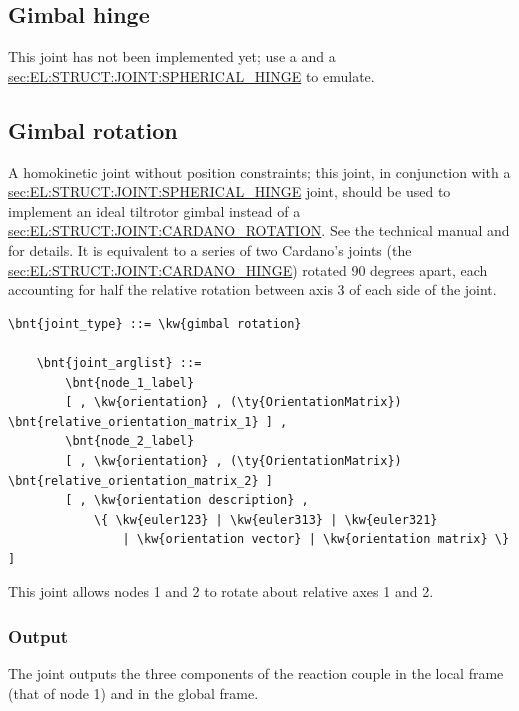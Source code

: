 \subsection{Gimbal hinge}
This joint has not been implemented yet; use a 
and a
\hyperref{\kw{spherical hinge}}{\kw{spherical hinge} (see Section~}{)}{sec:EL:STRUCT:JOINT:SPHERICAL_HINGE}
to emulate.

\subsection{Gimbal rotation}\label{sec:EL:JOINT:GIMBALROTATION}
A homokinetic joint without position constraints;
this joint, in conjunction with a
\hyperref{\kw{spherical hinge}}{\kw{spherical hinge} (see Section~}{)}{sec:EL:STRUCT:JOINT:SPHERICAL_HINGE}
joint, should be used to implement an ideal tiltrotor gimbal
instead of a
\hyperref{\kw{cardano rotation}}{\kw{cardano rotation} (see Section~}{)}{sec:EL:STRUCT:JOINT:CARDANO_ROTATION}.
See the technical manual and \cite{GIMBAL-2008} for details.
It is equivalent to a series of two Cardano's joints
(the \hyperref{\kw{cardano hinge}}{\kw{cardano hinge}, see Section~}{}{sec:EL:STRUCT:JOINT:CARDANO_HINGE})
rotated 90 degrees apart, each accounting for half the relative rotation
between axis 3 of each side of the joint.
\begin{Verbatim}[commandchars=\\\{\}]
    \bnt{joint_type} ::= \kw{gimbal rotation}

    \bnt{joint_arglist} ::= 
        \bnt{node_1_label}
        [ , \kw{orientation} , (\ty{OrientationMatrix}) \bnt{relative_orientation_matrix_1} ] ,
        \bnt{node_2_label}
        [ , \kw{orientation} , (\ty{OrientationMatrix}) \bnt{relative_orientation_matrix_2} ]
        [ , \kw{orientation description} ,
            \{ \kw{euler123} | \kw{euler313} | \kw{euler321}
                | \kw{orientation vector} | \kw{orientation matrix} \} ]
\end{Verbatim}
This joint allows nodes 1 and 2 to rotate about relative axes 1 and 2.

\subsubsection{Output}
The  joint outputs the three components
of the reaction couple in the local frame (that of node 1) 
and in the global frame.

